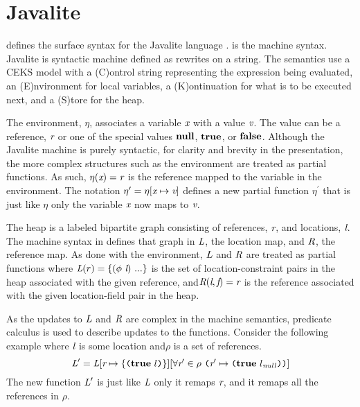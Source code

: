 \section{Javalite}
 defines the surface syntax for the
Javalite language \cite{saints-MS}.  is the
machine syntax. Javalite is syntactic machine defined as rewrites on a
string. The semantics use a CEKS model with a (C)ontrol string
representing the expression being evaluated, an (E)nvironment for
local variables, a (K)ontinuation for what is to be executed next, and
a (S)tore for the heap.




The environment, $\eta$, associates a variable $\emph{x}$ with a
value $\emph{v}$. The value can be a reference, $\emph{r}$ or one of
the special values $\textbf{null}$, $\textbf{true}$, or
$\textbf{false}$. Although the Javalite machine is purely syntactic, for
clarity and brevity in the presentation, the more complex structures
such as the environment are treated as partial functions. As such,
$\eta(\emph{x}) = \emph{r}$ is the reference mapped to the variable
in the environment. The notation $\eta^\prime = \eta[\emph{x} \mapsto
  \emph{v}]$ defines a new partial function $\eta^\prime$ that is
just like $\eta$ only the variable $\emph{x}$ now maps to
$\emph{v}$.

The heap is a labeled bipartite graph consisting of references,
$\emph{r}$, and locations, $\emph{l}$. The machine syntax in
 defines that graph in $\emph{L}$, the
location map, and $\emph{R}$, the reference map. As done with the
environment, $\emph{L}$ and $\emph{R}$ are treated as partial
functions where $\cfgnt{L}(r) = \{(\phi\ \cfgnt{l})\ ...\}$ is the set
of location-constraint pairs in the heap associated with the given
reference, and$\emph{R}(\emph{l},\emph{f}) = \emph{r}$ is the
reference associated with the given location-field pair in the
heap. 

As the updates to $\emph{L}$ and $\emph{R}$ are complex in the
machine semantics, predicate calculus is used to describe updates to
the functions. Consider the following example where $\emph{l}$ is
some location and$\rho$ is a set of references.
\[
\cfgnt{L}^\prime = \cfgnt{L}[\cfgnt{r} \mapsto \{\lp \cfgt{true}\ l\rp \}][\forall \cfgnt{r}^\prime \in \rho\ \lp \cfgnt{r}^\prime \mapsto \lp \cfgt{true}\ l_\mathit{null}\rp \rp ]
\]
The new function $\emph{L}^\prime$ is just like $\emph{L}$ only it
remaps $\emph{r}$, and it remaps all the references in $\rho$.

